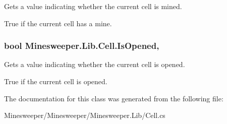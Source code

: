 Gets a value indicating whether the current cell is mined. 

True if the current cell has a mine.\hypertarget{class_minesweeper_1_1_lib_1_1_cell_a78511856244d5f3ed2c876b94d55fcd3}{
\subsubsection[{Is\+Opened}]{\setlength{\rightskip}{0pt plus 5cm}bool Minesweeper.\+Lib.\+Cell.\+Is\+Opened\hspace{0.3cm}{\ttfamily [get]}, {\ttfamily [set]}}}\label{class_minesweeper_1_1_lib_1_1_cell_a78511856244d5f3ed2c876b94d55fcd3}


Gets a value indicating whether the current cell is opened. 

True if the current cell is opened.

The documentation for this class was generated from the following file\+:\begin{DoxyCompactItemize}
\item 
Minesweeper/\+Minesweeper/\+Minesweeper.\+Lib/Cell.\+cs\end{DoxyCompactItemize}

